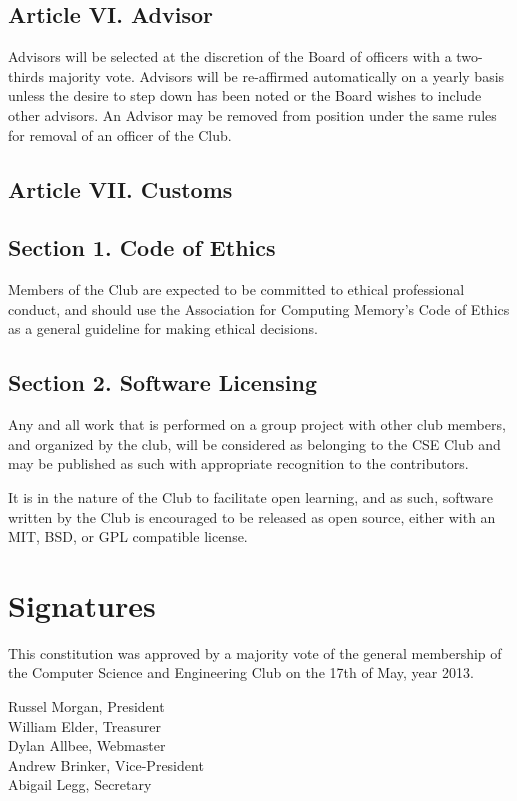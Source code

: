 \documentclass{article}
\begin{document}
  \subsection{Article VI. Advisor}
    Advisors will be selected at the discretion of the Board of officers with a two-thirds majority vote. Advisors will be re-affirmed automatically on a yearly basis unless the desire to step down has been noted or the Board wishes to include other advisors. An Advisor may be removed from position under the same rules for removal of an officer of the Club.

  \subsection{Article VII. Customs}
    \subsection{Section 1. Code of Ethics}
      Members of the Club are expected to be committed to ethical professional conduct, and should use the Association for Computing Memory's Code of Ethics as a general guideline for making ethical decisions.
    \subsection{Section 2. Software Licensing}
      Any and all work that is performed on a group project with other club members, and organized by the club, will be considered as belonging to the CSE Club and may be published as such with appropriate recognition to the contributors.

      It is in the nature of the Club to facilitate open learning, and as such, software written by the Club is encouraged to be released as open source, either with an MIT, BSD, or GPL compatible license.

  \section{Signatures}
    This constitution was approved by a majority vote of the general membership of the Computer Science and Engineering Club on the 17th of May, year 2013.\\[0.4in]



  \begin{multicols}{2}
    Russel Morgan, President\\[0.2in]

    William Elder, Treasurer\\[0.2in]

    Dylan Allbee, Webmaster\\[0.2in]

    Andrew Brinker, Vice-President\\[0.2in]

    Abigail Legg, Secretary\\[0.2in]

    ~\\
  \end{multicols}
\end{document}
